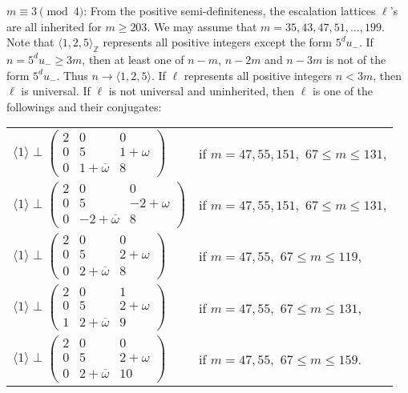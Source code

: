 \documentclass[a4paper,10pt,reqno]{amsart}
\begin{document}
{} $m \equiv 3 \pmod{4}$: From the positive semi-definiteness, the escalation
lattices $\ell$'s are all inherited for $m \ge 203$. We may assume that $m = 35, 43, 47, 51,
\dotsc, 199$. Note that ${\langle {1,2,5} \rangle}_{\mathbb{Z}}$ represents all positive integers except the form $5^{d}
u_{-}$. If $n=5^{d}u_{-} \ge 3m$, then at least one of $n-m$, $n-2m$ and $n-3m$ is not of the form
$5^{d}u_{-}$. Thus $n \to {\langle {1,2,5} \rangle}$. If $\ell$ represents all positive integers $n < 3m$, then
$\ell$ is universal. If $\ell$ is not universal and uninherited, then $\ell$ is one of the
followings and their conjugates:

\begin{tabular}{ll}
${\langle {1} \rangle} \perp {\begin{pmatrix}
  2 & 0 & 0 \\
  0 & 5 & {1+\omega} \\
  0 & {1+{{{\overline{\omega}}}}} & 8
\end{pmatrix}}$
                  & if $m = 47,55,151,$ $67 \leq  m \leq 131$,\\
${\langle {1} \rangle} \perp {\begin{pmatrix}
  2 & 0 & 0 \\
  0 & 5 & {-2+\omega} \\
  0 & {-2+{{{\overline{\omega}}}}} & 8
\end{pmatrix}}$
                  & if $m = 47,55,151,$ $67 \leq  m \leq 131$,\\
${\langle {1} \rangle} \perp {\begin{pmatrix}
  2 & 0 & 0 \\
  0 & 5 & {2+\omega} \\
  0 & {2+{{{\overline{\omega}}}}} & 8
\end{pmatrix}}$
                  & if $m = 47,55,$ $67 \leq  m \leq 119$,\\
${\langle {1} \rangle} \perp {\begin{pmatrix}
  2 & 0 & 1 \\
  0 & 5 & {2+\omega} \\
  1 & {2+{{{\overline{\omega}}}}} & 9
\end{pmatrix}}$
                  & if $m = 47,55,$ $67 \leq  m \leq 131$,\\
${\langle {1} \rangle} \perp {\begin{pmatrix}
  2 & 0 & 0 \\
  0 & 5 & {2+\omega} \\
  0 & {2+{{{\overline{\omega}}}}} & {10}
\end{pmatrix}}$
                  & if $m = 47,55,$ $67 \leq  m \leq 159.$\\
\end{tabular}
\end{document}
